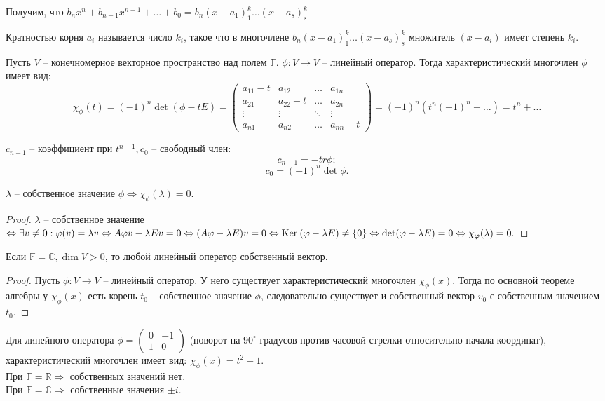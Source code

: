 Получим, что $b_nx^n + b_{n-1}x^{n-1} + \ldots + b_0 = b_n(x - a_1)^k_1\ldots(x - a_s)^k_s$
\begin{Def}
	Кратностью корня $a_i$ называется число $k_i$, такое что в многочлене $b_n(x - a_1)^k_1\ldots(x - a_s)^k_s$ множитель $(x - a_i)$ имеет степень $k_i$.
\end{Def}
\begin{Def}
	Пусть $V$ -- конечномерное векторное пространство над полем $\mathbb{F}$. $\phi: V \to V$ -- линейный оператор. Тогда характеристический многочлен $\phi$ имеет вид:
	\[\chi_{\phi}(t) = (-1)^n\det(\phi - tE) =
  \begin{pmatrix}
  a_{11} - t & a_{12} &\ldots &a_{1n}\\
  a_{21} & a_{22} - t &\ldots &a_{2n} \\
  \vdots &\vdots &\ddots &\vdots\\
  a_{n1} &a_{n2} &\ldots & a_{nn} - t
  \end{pmatrix}
  = (-1)^n(t^n(-1)^n + \ldots)  = t^n + \ldots \]
\end{Def}
\begin{Task}
	$c_{n-1}$ -- коэффициент при $t^{n-1}, c_0$ -- свободный член:
	\[c_{n-1} = -tr\phi;\]
        \[c_0 = (-1)^n \det\phi.\]
\end{Task}
\begin{Statement}
	$\lambda$ -- собственное значение $\phi \Leftrightarrow \chi_\phi(\lambda) = 0.$ 
\end{Statement}
\begin{proof}
	$\lambda$ -- собственное значение $\Leftrightarrow \exists v \neq 0: \varphi(v) = \lambda {v} \Leftrightarrow A\varphi v - \lambda {E}v = 0 \Leftrightarrow (A\varphi - \lambda {E})v = 0 \Leftrightarrow \mathrm{Ker}\:(\varphi - \lambda {E}) \neq \{0\}
	\Leftrightarrow \det(\varphi - \lambda {E}) = 0 \Leftrightarrow \chi_\varphi(\lambda) = 0.$
\end{proof}
\begin{Statement}
	Если $\mathbb{F} = \mathbb{C}, \dim V > 0$, то любой линейный оператор собственный вектор.
\end{Statement}
\begin{proof}
	Пусть $\phi: V \to V$ -- линейный оператор. У него существует характеристический многочлен $\chi_\phi(x)$. Тогда по основной теореме алгебры у $\chi_\phi(x)$ есть корень $t_0$ -- собственное значение $\phi$, следовательно существует и собственный вектор $v_0$  с собственным значением $t_0$.
\end{proof}
\begin{Examples}
	Для линейного оператора $\phi = \begin{pmatrix}
    0& -1 \\
    1& 0
    \end{pmatrix}$
    (поворот на $90^\circ$ градусов против часовой стрелки относительно начала координат), характеристический многочлен имеет вид: $\chi_\phi(x) = t^2+1$.
    \\ При $\mathbb{F}  = \mathbb{R} \Rightarrow$ собственных значений нет.
    \\ При $\mathbb{F} = \mathbb{C} \Rightarrow$ собственные значения $\pm i$.
\end{Examples}
